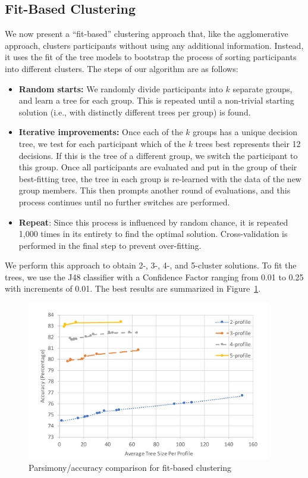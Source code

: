 \subsection{Fit-Based Clustering}
We now present a ``fit-based'' clustering approach that, like the agglomerative approach, clusters participants without using any additional information. Instead, it uses the fit of the tree models to bootstrap the process of sorting participants into different clusters. The steps of our algorithm are as follows:
\begin{itemize}
	\item \textbf{Random starts:} We randomly divide participants into $k$ separate groups, and learn a tree for each group. This is repeated until a non-trivial starting solution (i.e., with distinctly different trees per group) is found. 
	
	\item \textbf{Iterative improvements:} Once each of the $k$ groups has a unique decision tree, we test for each participant which of the $k$ trees best represents their 12 decisions. If this is the tree of a different group, we switch the participant to this group. Once all participants are evaluated and put in the group of their best-fitting tree, the tree in each group is re-learned with the data of the new group members. This then prompts another round of evaluations, and this process continues until no further switches are performed.
	
	\item \textbf{Repeat}: Since this process is influenced by random chance, it is repeated 1,000 times in its entirety to find the optimal solution. Cross-validation is performed in the final step to prevent over-fitting.
\end{itemize}

We perform this approach to obtain 2-, 3-, 4-, and 5-cluster solutions. To fit the trees, we use the J48 classifier with a Confidence Factor ranging from 0.01 to 0.25 with increments of 0.01. The best results are summarized in Figure~\ref{fig:fitsum}.

\begin{figure}
	\centering
	\includegraphics[width=0.95\textwidth]{figures/fitSum.pdf}
	\caption{Parsimony/accuracy comparison for fit-based clustering}
	\label{fig:fitsum}
\end{figure}

